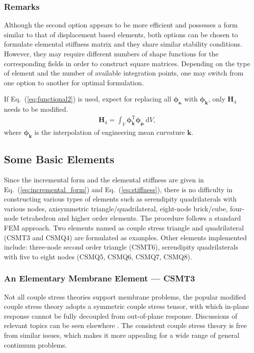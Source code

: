 \documentclass[3p,sort&compress,11pt,fleqn]{elsarticle}
\newcommand*{\eqsref}[1]{Eq.~(\ref{#1})}
\newcommand*{\mT}{\mathrm{T}}
\newcommand*{\md}[1]{\mathrm{d}#1}
\begin{document}
\subsubsection{Remarks}
Although the second option appears to be more efficient and possesses a form similar to that of displacement based elements, both options can be chosen to formulate elemental stiffness matrix and they share similar stability conditions. However, they may require different numbers of shape functions for the corresponding fields in order to construct square matrices. Depending on the type of element and the number of available integration points, one may switch from one option to another for optimal formulation.

If \eqsref{eq:functional2} is used, expect for replacing all $\mathbold{\phi}_\mathbold{\kappa}$ with $\mathbold{\phi}_\mathbold{k}$, only $\mathbold{H}_4$ needs to be modified.
\begin{gather}
\mathbold{H}_4=\int_V\mathbold{\phi}_\mathbold{k}^\mT\mathbold{\phi}_\mathbold{\mu}~\md{V},
\end{gather}
where $\mathbold{\phi}_\mathbold{k}$ is the interpolation of engineering mean curvature $\mathbold{k}$.
\subsection{Some Basic Elements}
Since the incremental form and the elemental stiffness are given in \eqsref{eq:incremental_form} and \eqsref{eq:stiffness}, there is no difficulty in constructing various types of elements such as serendipity quadrilaterals with various nodes, axisymmetric triangle/quadrilateral, eight-node brick/cube, four-node tetrahedron and higher order elements. The procedure follows a standard FEM approach. Two elements named as couple stress triangle and quadrilateral (CSMT3 and CSMQ4) are formulated as examples. Other elements implemented \citep{Chang2021} include: three-node second order triangle (CSMT6), serendipity quadrilaterals with five to eight nodes (CSMQ5, CSMQ6, CSMQ7, CSMQ8).
\subsubsection{An Elementary Membrane Element --- CSMT3}
Not all couple stress theories support membrane problems, the popular modified couple stress theory \citep{Yang2002} adopts a symmetric couple stress tensor, with which in-plane response cannot be fully decoupled from out-of-plane response. Discussions of relevant topics can be seen elsewhere \citep{Hadjesfandiari2016}. The consistent couple stress theory is free from similar issues, which makes it more appealing for a wide range of general continuum problems.
\end{document}
